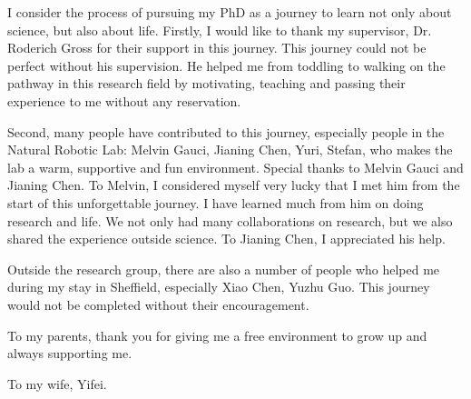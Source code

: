 I consider the process of pursuing my PhD as a journey to learn not only about science, but also about life. Firstly, I would like to thank my supervisor, Dr. Roderich Gross for their support in this journey. This journey could not be perfect without his supervision. He helped me from toddling to walking on the pathway in this research field by motivating, teaching and passing their experience to me without any reservation. 

Second, many people have contributed to this journey, especially people in the Natural Robotic Lab: Melvin Gauci, Jianing Chen, Yuri, Stefan, who makes the lab a warm, supportive and fun environment. Special thanks to Melvin Gauci and Jianing Chen. To Melvin, I considered myself very lucky that I met him from the start of this unforgettable journey. I have learned much from him on doing research and life. We not only had many collaborations on research, but we also shared the experience outside science. To Jianing Chen, I appreciated his help. 

Outside the research group, there are also a number of people who helped me during my stay in Sheffield, especially Xiao Chen, Yuzhu Guo. This journey would not be completed without their encouragement. 
   
To my parents, thank you for giving me a free environment to grow up and always supporting me.
  
To my wife, Yifei.
